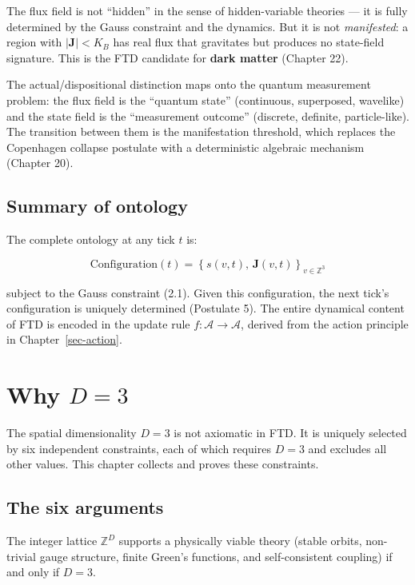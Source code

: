 \documentclass[
  11pt,
  letterpaper,
  twoside,
  openany]{book}
\makeatletter
\let\orig@section\section
\renewcommand{\section}{\needspace{8\baselineskip}\orig@section}
\makeatother
\begin{document}
The flux field is not ``hidden'' in the sense of hidden-variable
theories --- it is fully determined by the Gauss constraint and the
dynamics. But it is not \emph{manifested}: a region with
\(|\mathbf{J}| < K_B\) has real flux that gravitates but produces no
state-field signature. This is the FTD candidate for \textbf{dark
matter} (Chapter 22).

The actual/dispositional distinction maps onto the quantum measurement
problem: the flux field is the ``quantum state'' (continuous,
superposed, wavelike) and the state field is the ``measurement outcome''
(discrete, definite, particle-like). The transition between them is the
manifestation threshold, which replaces the Copenhagen collapse
postulate with a deterministic algebraic mechanism (Chapter 20).

\section{Summary of ontology}\label{summary-of-ontology}

The complete ontology at any tick \(t\) is:

\[
\text{Configuration}(t) = \left\{ s(v,t), \, \mathbf{J}(v,t) \right\}_{v \in \mathbb{Z}^3}
\]

subject to the Gauss constraint (2.1). Given this configuration, the
next tick's configuration is uniquely determined (Postulate 5). The
entire dynamical content of FTD is encoded in the update rule
\(f : \mathcal{A} \to \mathcal{A}\), derived from the action principle
in Chapter~\ref{sec-action}.

\chapter{\texorpdfstring{Why \(D = 3\)}{Why D = 3}}\label{sec-d3}

The spatial dimensionality \(D = 3\) is not axiomatic in FTD. It is
uniquely selected by six independent constraints, each of which requires
\(D = 3\) and excludes all other values. This chapter collects and
proves these constraints.

\section{The six arguments}\label{the-six-arguments}

\begin{ftdtheorem}

The integer lattice \(\mathbb{Z}^D\) supports a physically viable theory
(stable orbits, non-trivial gauge structure, finite Green's functions,
and self-consistent coupling) if and only if \(D = 3\).

\end{ftdtheorem}
\end{document}
